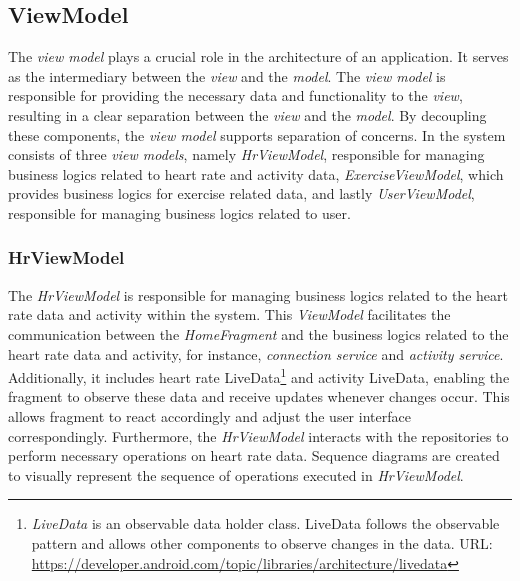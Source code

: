 \subsection{ViewModel}
\label{chap:viewmodel_design}
The \emph{view model} plays a crucial role in the architecture of an application. It serves as the intermediary between the \emph{view} and the \emph{model}.
The \emph{view model} is responsible for providing the necessary data and functionality to the \emph{view}, resulting in a clear separation between the \emph{view} and the \emph{model}.
By decoupling these components, the \emph{view model} supports separation of concerns.
In the system consists of three \emph{view models}, namely \emph{HrViewModel}, responsible for managing business logics related to heart rate and activity data, \emph{ExerciseViewModel}, which provides business logics for exercise related data, and lastly \emph{UserViewModel}, responsible for managing business logics related to user.

\subsubsection{HrViewModel}
\label{chap:hrviewmodel_design}
The \emph{HrViewModel} is responsible for managing business logics related to the heart rate data and activity within the system.
This \emph{ViewModel} facilitates the communication between the \emph{HomeFragment} and the business logics related to the heart rate data and activity, for instance, \emph{connection service} and \emph{activity service}.
Additionally, it includes heart rate LiveData\footnote{\emph{LiveData} is an observable data holder class. LiveData follows the observable pattern and allows other components to observe changes in the data. URL: \url{https://developer.android.com/topic/libraries/architecture/livedata}} and activity LiveData, enabling the fragment to observe these data and receive updates whenever changes occur. This allows fragment to react accordingly and adjust the user interface correspondingly.
Furthermore, the \emph{HrViewModel} interacts with the repositories to perform necessary operations on heart rate data.
Sequence diagrams are created to visually represent the sequence of operations executed in \emph{HrViewModel}.

